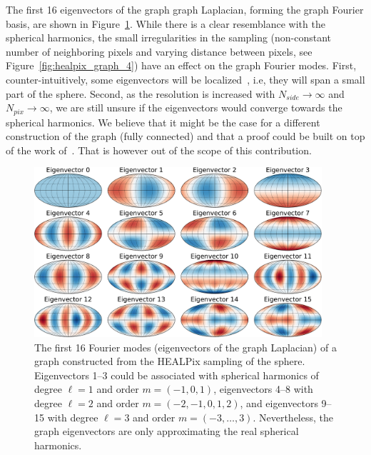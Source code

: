 \documentclass[final,twocolumn,3p,times,authoryear]{elsarticle}
\newcommand{\todo}[1]{{\color[rgb]{.6,.1,.6}{#1}}}
\newcommand{\figref}[1]{Figure~\ref{fig:#1}}
\newcommand{\1}{\b{1}}              %
\newcommand{\0}{\b{0}}              %
\begin{document}
The first 16 eigenvectors of the graph graph Laplacian, forming the graph Fourier basis, are shown in \figref{graph_harmonics}. While there is a clear resemblance with the spherical harmonics, the small irregularities in the sampling (non-constant number of neighboring pixels and varying distance between pixels, see \figref{healpix_graph_4}) have an effect on the graph Fourier modes.
First, counter-intuitively, some eigenvectors will be localized~\citep{perraudin2018global}, i.e, they will span a small part of the sphere.
Second, as the resolution is increased with $N_{side} \rightarrow \infty$ and $N_{pix} \rightarrow \infty$, we are still unsure if the eigenvectors would converge towards the spherical harmonics. We believe that it might be the case for a different construction of the graph (fully connected) and that a proof could be built on top of the work of~\cite{belkin2007convergence}. That is however out of the scope of this contribution.

\label{sec:spherical_harmonics}
\begin{figure}[!htb]
\centering
\includegraphics[width=0.95\textwidth]{figures/eigenvectors.pdf}
\caption{The first 16 Fourier modes (eigenvectors of the graph Laplacian) of a graph constructed from the HEALPix sampling of the sphere. Eigenvectors 1--3 could be associated with spherical harmonics of degree $\ell=1$ and order $m=(-1,0,1)$, eigenvectors 4--8 with degree $\ell=2$ and order $m=(-2,-1,0,1,2)$, and eigenvectors 9--15 with degree $\ell=3$ and order $m=(-3,\ldots,3)$. Nevertheless, the graph eigenvectors are only approximating the real spherical harmonics. \todo{show group of eigenvectors as indication of mode $\ell$. Either show eigenvalues on this plot or add a plot of the eigenvalues themselves.}}
\label{fig:graph_harmonics}
\end{figure}
\end{document}
